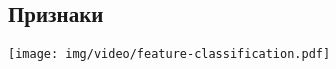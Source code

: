 

\subsection{Признаки}

\begin{frame}{}
    \begin{center}
        \texttt{[image: img/video/feature-classification.pdf]}
    \end{center}
\end{frame}
